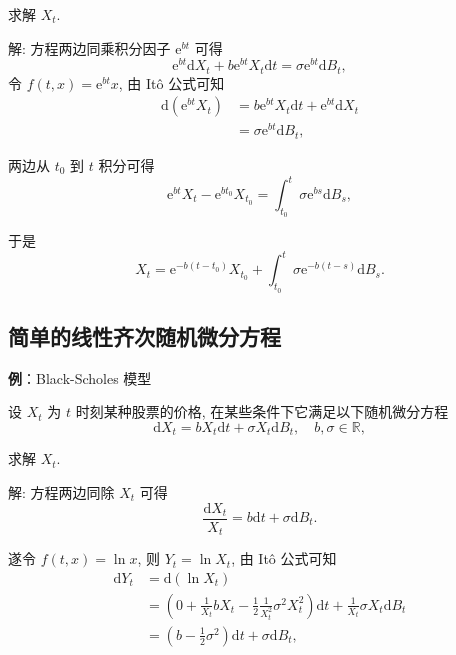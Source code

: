 \documentclass[openany]{ctexbook}
\theoremstyle{kaiti}
\theoremstyle{normal}
\begin{document}
求解 $X_t$.

解: 方程两边同乘积分因子 $\mathrm{e}^{b t}$ 可得
\begin{equation}
  \mathrm{e}^{b t}\mathrm{d}X_t+b\mathrm{e}^{b t} X_t\mathrm{d}t=\sigma\mathrm{e}^{b t}\mathrm{d}B_t,
\end{equation}
令 $f(t,x)=\mathrm{e}^{b t}x$, 由 It\^o 公式可知
\begin{equation}
  \begin{aligned}
  \mathrm{d}(\mathrm{e}^{b t}X_t)
  &=b\mathrm{e}^{b t} X_t\mathrm{d}t+\mathrm{e}^{b t}\mathrm{d}X_t\\
  &=\sigma\mathrm{e}^{b t}\mathrm{d}B_t,
  \end{aligned}
\end{equation}

两边从 $t_0$ 到 $t$ 积分可得
\begin{equation}
  \mathrm{e}^{b t}X_t-\mathrm{e}^{b t_0}X_{t_0}=\int_{t_0}^t\sigma\mathrm{e}^{b s}\mathrm{d}B_s,
\end{equation}

于是
\begin{equation}
  X_t=\mathrm{e}^{-b (t-t_0)}X_{t_0}+\int_{t_0}^t\sigma\mathrm{e}^{-b (t-s)}\mathrm{d}B_s.
\end{equation}

\subsection{简单的线性齐次随机微分方程}

\textbf{例}：Black-Scholes 模型

设 $X_t$ 为 $t$ 时刻某种股票的价格, 在某些条件下它满足以下随机微分方程
\begin{equation}
  \mathrm{d}X_t=b X_t\mathrm{d}t+\sigma X_t\mathrm{d}B_t,\quad b,\sigma\in\mathbb{R},
\end{equation}

求解 $X_t$.

解: 方程两边同除 $X_t$ 可得
\begin{equation}
  \frac{\mathrm{d}X_t}{X_t}=b \mathrm{d}t+\sigma \mathrm{d}B_t.
\end{equation}

遂令 $f(t,x)=\ln x$, 则 $Y_t=\ln X_t$, 由 It\^o 公式可知
\begin{equation}
  \begin{aligned}
    \mathrm{d}Y_t
    &=\mathrm{d}(\ln X_t)\\
    &=\left(0+\frac{1}{X_t}b X_t-\frac{1}{2}\frac{1}{X_t^2}\sigma^2 X_t^2\right)\mathrm{d}t+\frac{1}{X_t}\sigma X_t\mathrm{d}B_t\\
    &=\left(b-\frac{1}{2}\sigma^2\right)\mathrm{d}t+\sigma\mathrm{d}B_t,\\
  \end{aligned}
\end{equation}
\end{document}
